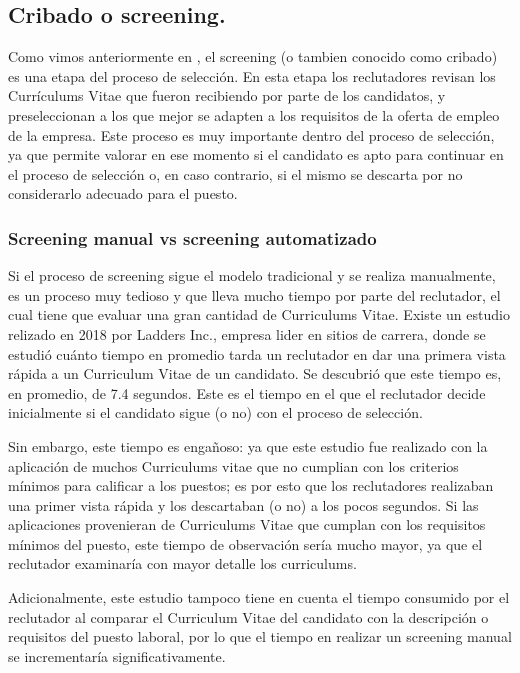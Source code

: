 \documentclass[12pt,a4paper]{article}
\begin{document}
\begin{sloppypar}
\cleardoublepage    %

\subsection{Cribado o screening.}  

Como vimos anteriormente en \textit{}, el screening (o tambien conocido como cribado) es una etapa del proceso de selección. 
En esta etapa los reclutadores revisan los Currículums Vitae que fueron recibiendo por parte de los candidatos, y \\ preseleccionan a los que mejor se adapten a los requisitos de la oferta de empleo de la empresa. Este proceso es muy importante dentro del proceso de selección, ya que permite valorar en ese momento si el candidato es apto para continuar en el proceso de selección o, en caso contrario, si el mismo se descarta por no considerarlo adecuado para el puesto.

\subsubsection{Screening manual vs screening automatizado}  

Si el proceso de screening sigue el modelo tradicional y se realiza manualmente, es un proceso muy tedioso y que lleva mucho tiempo por parte del reclutador, el cual tiene que evaluar una gran cantidad de Curriculums Vitae. Existe un estudio\cite{estudio_eye_tracking} relizado en 2018 por Ladders Inc., empresa lider en sitios de carrera, donde se estudió cuánto tiempo en promedio tarda un reclutador en dar una primera vista rápida a un Curriculum Vitae de un candidato. Se descubrió que este tiempo es, en promedio, de 7.4 segundos. Este es el tiempo en el que el reclutador decide inicialmente si el candidato sigue (o no) con el proceso de selección.

Sin embargo, este tiempo es engañoso: ya que este estudio fue realizado con la aplicación de muchos Curriculums vitae que no cumplian con los criterios mínimos para calificar a los puestos; es por esto que los reclutadores realizaban una primer vista rápida y los descartaban (o no) a los pocos segundos. Si las aplicaciones provenieran de Curriculums Vitae que cumplan con los requisitos mínimos del puesto, este tiempo de observación sería mucho mayor, ya que el reclutador examinaría con mayor detalle los curriculums.

Adicionalmente, este estudio tampoco tiene en cuenta el tiempo consumido por el reclutador al comparar el Curriculum Vitae del candidato con la descripción o requisitos del puesto laboral, por lo que el tiempo en realizar un screening manual se incrementaría significativamente.


\end{sloppypar}
\end{document}
